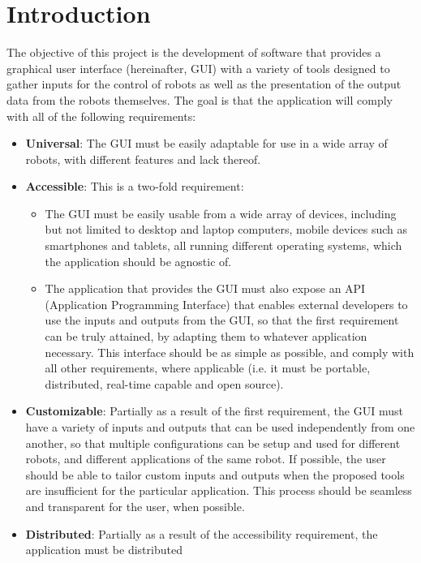\chapter{Introduction} \label{introduction}
The objective of this project is the development of software that provides a graphical user interface (hereinafter, GUI) 
with a variety of tools designed to gather inputs for the control of robots as well as the presentation of the output data 
from the robots themselves. The goal is that the application will comply with all of the following requirements:
\begin{itemize}
	\item \textbf{Universal}: The GUI must be easily adaptable for use in a wide array of robots, with different features 
	and lack thereof.
	\item \textbf{Accessible}: This is a two-fold requirement:
	\begin{itemize}
		\item The GUI must be easily usable from a wide array of devices, including but not limited to desktop and laptop 
		computers, mobile devices such as smartphones and tablets, all running different operating systems, which the 
		application should be agnostic of.
		\item The application that provides the GUI must also expose an API (Application Programming Interface) that enables 
		external developers to use the inputs and outputs from the GUI, so that the first requirement can be truly attained, 
		by adapting them to whatever application necessary. This interface should be as simple as possible, and comply with 
		all other requirements, where applicable (i.e. it must be portable, distributed, real-time capable and open source).
	\end{itemize}
	\item \textbf{Customizable}: Partially as a result of the first requirement, the GUI must have a variety of inputs and 
	outputs that can be used independently from one another, so that multiple configurations can be setup and used for 
	different robots, and different applications of the same robot. If possible, the user should be able to tailor custom 
	inputs and outputs when the proposed tools are insufficient for the particular application. This process should be 
	seamless and transparent for the user, when possible.
	\item \textbf{Distributed}: Partially as a result of the accessibility requirement, the application must be distributed 

\end{itemize}
